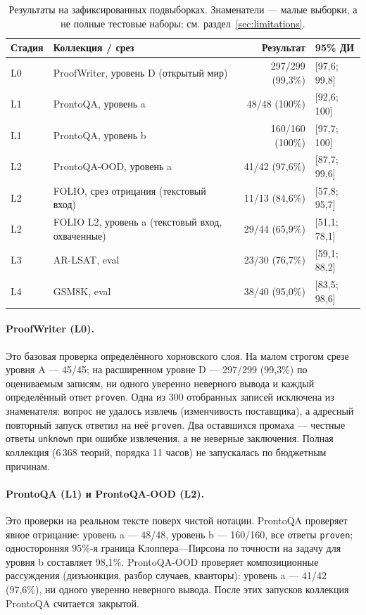\documentclass[11pt,a4paper]{article}
\begin{document}
\begin{table}[h]
\centering
\begin{tabular}{llrp{2.6cm}}
\toprule
\textbf{Стадия} & \textbf{Коллекция / срез} & \textbf{Результат} & \textbf{95\% ДИ} \\
\midrule
L0 & ProofWriter, уровень D (открытый мир) & 297/299 (99{,}3\%) & [97{,}6; 99{,}8] \\
L1 & ProntoQA, уровень a & 48/48 (100\%) & [92{,}6; 100] \\
L1 & ProntoQA, уровень b & 160/160 (100\%) & [97{,}7; 100] \\
L2 & ProntoQA-OOD, уровень a & 41/42 (97{,}6\%) & [87{,}7; 99{,}6] \\
L2 & FOLIO, срез отрицания (текстовый вход) & 11/13 (84{,}6\%) & [57{,}8; 95{,}7] \\
L2 & FOLIO L2, уровень a (текстовый вход, охваченные) & 29/44 (65{,}9\%) & [51{,}1; 78{,}1] \\
L3 & AR-LSAT, eval & 23/30 (76{,}7\%) & [59{,}1; 88{,}2] \\
L4 & GSM8K, eval & 38/40 (95{,}0\%) & [83{,}5; 98{,}6] \\
\bottomrule
\end{tabular}
\caption{Результаты на зафиксированных подвыборках. Знаменатели — малые выборки, а не полные тестовые наборы; см. раздел~\ref{sec:limitations}.}
\label{tab:results}
\end{table}

\paragraph{ProofWriter (L0).} Это базовая проверка определённого хорновского слоя. На малом строгом срезе уровня A — 45/45;
на расширенном уровне D — 297/299 (99{,}3\%) по оцениваемым записям, ни одного уверенно неверного вывода и каждый определённый
ответ \texttt{proven}. Одна из 300 отобранных записей исключена из знаменателя: вопрос не удалось извлечь
(изменчивость поставщика), а адресный повторный запуск ответил на неё \texttt{proven}. Два оставшихся промаха
 — честные ответы \texttt{unknown} при ошибке извлечения, а не неверные заключения. Полная коллекция
(6\,368 теорий, порядка 11 часов) не запускалась по бюджетным причинам.

\paragraph{ProntoQA (L1) и ProntoQA-OOD (L2).} Это проверки на реальном тексте поверх чистой нотации. ProntoQA проверяет
явное отрицание: уровень a — 48/48, уровень b — 160/160, все ответы \texttt{proven}; односторонняя 95\%-я граница
Клоппера—Пирсона по точности на задачу для уровня b составляет 98{,}1\%. ProntoQA-OOD проверяет композиционные рассуждения
(дизъюнкция, разбор случаев, кванторы): уровень a — 41/42 (97{,}6\%), ни одного уверенно неверного вывода. После этих
запусков коллекция ProntoQA считается закрытой.
\end{document}
